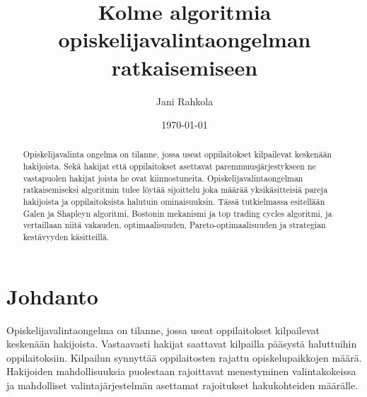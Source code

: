 \documentclass[gradu, twoside]{tktltiki}
\begin{document}
\title{Kolme algoritmia opiskelijavalintaongelman ratkaisemiseen}
\author{Jani Rahkola}
\date{\today}
\numberofpagesinformation{}



\maketitle

\doublespacing

\subject{Tietojenkäsittelytiede}

\def\hyph{-\penalty0\hskip0pt\relax}
\hyphenation{}

\begin{abstract}
Opiskelijavalinta ongelma on tilanne, jossa useat oppilaitokset
kilpailevat keskenään hakijoista. Sekä hakijat että oppilaitokset
asettavat paremmuusjärjestykseen ne vastapuolen hakijat joista he ovat
kiinnostuneita. Opiskelijavalintaongelman ratkaisemiseksi algoritmin
tulee löytää sijoittelu joka määrää yksikäsitteisiä pareja hakijoista
ja oppilaitoksista halutuin ominaisuuksin. Tässä tutkielmassa
esitellään Galen ja Shapleyn algoritmi, Bostonin mekanismi ja top
trading cycles algoritmi, ja vertaillaan niitä vakauden,
optimaalisuuden, Pareto\hyph optimaalisuuden ja strategian kestävyyden
käsitteillä.
\end{abstract}

\mytableofcontents

\section{Johdanto}

Opiskelijavalintaongelma on tilanne, jossa useat oppilaitokset
kilpailevat keskenään hakijoista. Vastaavasti hakijat saattavat
kilpailla pääsystä haluttuihin oppilaitoksiin. Kilpailun synnyttää
oppilaitosten rajattu opiskelupaikkojen määrä. Hakijoiden
mahdollisuuksia puolestaan rajoittavat menestyminen valintakokeissa ja
mahdolliset valintajärjestelmän asettamat rajoitukset hakukohteiden
määrälle.
\end{document}
